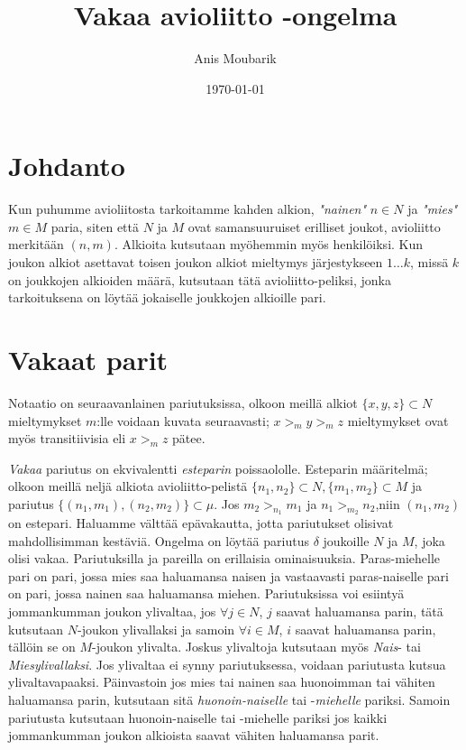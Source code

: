 \documentclass[finnish]{tktltiki2}
\title{Vakaa avioliitto -ongelma}
\author{Anis Moubarik}
\date{\today}
\theoremstyle{definition}
\theoremstyle{remark}
\begin{document}

\maketitle        %
\makeabstract     %

\tableofcontents  %
\newpage          %



\section{Johdanto}
Kun puhumme avioliitosta tarkoitamme kahden alkion, \emph{"nainen"} $n \in N$ ja \emph{"mies"} $m \in M$ paria, siten että $N$ ja $M$ ovat samansuuruiset erilliset joukot, avioliitto merkitään $(n, m)$. Alkioita kutsutaan myöhemmin myös henkilöiksi.
Kun joukon alkiot asettavat toisen joukon alkiot mieltymys järjestykseen $1 \ldots k$, missä $k$ on joukkojen alkioiden määrä, kutsutaan tätä avioliitto-peliksi, jonka tarkoituksena on löytää jokaiselle joukkojen alkioille pari. 


\section{Vakaat parit}
Notaatio on seuraavanlainen pariutuksissa, olkoon meillä alkiot $\{x, y, z\} \subset N$ mieltymykset $m$:lle voidaan kuvata seuraavasti; $x >_m y >_m z$ mieltymykset ovat myös transitiivisia eli $x >_m z$ pätee.

\emph{Vakaa} pariutus on ekvivalentti \emph{esteparin} poissaololle. Esteparin määritelmä; olkoon meillä neljä alkiota avioliitto-pelistä $\{n_1, n_2\} \subset N, \{m_1, m_2\} \subset M$ ja pariutus $\{(n_1, m_1), (n_2, m_2)\} \subset \mu$. Jos $m_2 >_{n_1} m_1$ ja $n_1 >_{m_2} n_2$,niin $(n_1, m_2)$ on estepari. Haluamme välttää epävakautta, jotta pariutukset olisivat mahdollisimman kestäviä. Ongelma on löytää pariutus $\delta$ joukoille $N$ ja $M$, joka olisi vakaa.
Pariutuksilla ja pareilla on erillaisia ominaisuuksia. Paras-miehelle pari on pari, jossa mies saa haluamansa naisen ja vastaavasti paras-naiselle pari on pari, jossa nainen saa haluamansa miehen. Pariutuksissa voi esiintyä jommankumman joukon ylivaltaa, jos $\forall j \in N$, $j$ saavat haluamansa parin, tätä kutsutaan $N$-joukon ylivallaksi ja samoin $\forall i \in M$, $i$ saavat haluamansa parin, tällöin se on $M$-joukon ylivalta. Joskus ylivaltoja kutsutaan myös \emph{Nais}- tai \emph{Miesylivallaksi}. Jos ylivaltaa ei synny pariutuksessa, voidaan pariutusta kutsua ylivaltavapaaksi.
Päinvastoin jos mies tai nainen saa huonoimman tai vähiten haluamansa parin, kutsutaan sitä \emph{huonoin-naiselle} tai -\emph{miehelle} pariksi. Samoin pariutusta kutsutaan huonoin-naiselle tai -miehelle pariksi jos kaikki jommankumman joukon alkioista saavat vähiten haluamansa parit.
\end{document}
